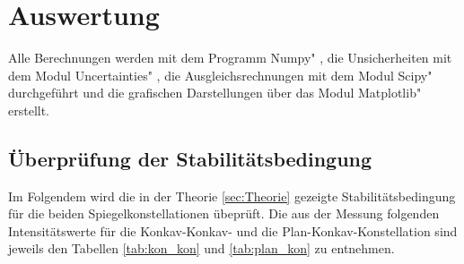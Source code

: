 \section{Auswertung}
\label{sec:Auswertung}
Alle Berechnungen werden mit dem Programm \glqq Numpy" \cite{numpy}, die Unsicherheiten mit dem Modul \glqq Uncertainties" \cite{uncertainties}, die Ausgleichsrechnungen mit dem Modul \glqq Scipy" \cite{scipy} durchgeführt und die grafischen Darstellungen über das Modul \glqq Matplotlib" \cite{matplotlib} erstellt.

\subsection{Überprüfung der Stabilitätsbedingung}

Im Folgendem wird die in der Theorie \ref{sec:Theorie} gezeigte Stabilitätsbedingung für die beiden Spiegelkonstellationen übeprüft.
Die aus der Messung folgenden Intensitätswerte für die Konkav-Konkav- und die Plan-Konkav-Konstellation sind jeweils den Tabellen \ref{tab:kon_kon} und \ref{tab:plan_kon} zu entnehmen.
 


%

